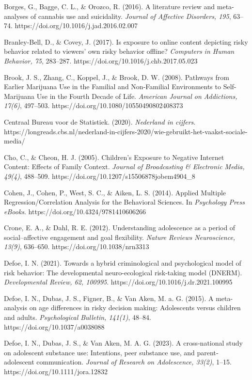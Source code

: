 \documentclass[
  letterpaper,
  DIV=11,
  numbers=noendperiod]{scrartcl}
\begin{document}
Borges, G., Bagge, C. L., \& Orozco, R. (2016). A literature review and
meta-analyses of cannabis use and suicidality. \emph{Journal of
Affective Disorders, 195}, 63--74.
https://doi.org/10.1016/j.jad.2016.02.007

Branley-Bell, D., \& Covey, J. (2017). Is exposure to online content
depicting risky behavior related to viewers' own risky behavior offline?
\emph{Computers in Human Behavior, 75}, 283--287.
https://doi.org/10.1016/j.chb.2017.05.023

Brook, J. S., Zhang, C., Koppel, J., \& Brook, D. W. (2008). Pathways
from Earlier Marijuana Use in the Familial and Non-Familial Environments
to Self-Marijuana Use in the Fourth Decade of Life. \emph{American
Journal on Addictions, 17(6)}, 497--503.
https://doi.org/10.1080/10550490802408373

Centraal Bureau voor de Statistiek. (2020). \emph{Nederland in cijfers}.
https://longreads.cbs.nl/nederland-in-cijfers-2020/wie-gebruikt-het-vaakst-sociale-
media/

Cho, C., \& Cheon, H. J. (2005). Children's Exposure to Negative
Internet Content: Effects of Family Context. \emph{Journal of
Broadcasting \& Electronic Media, 49(4)}, 488--509.
https://doi.org/10.1207/s15506878jobem4904\_8

Cohen, J., Cohen, P., West, S. C., \& Aiken, L. S. (2014). Applied
Multiple Regression/Correlation Analysis for the Behavioral Sciences. In
\emph{Psychology Press eBooks}. https://doi.org/10.4324/9781410606266

Crone, E. A., \& Dahl, R. E. (2012). Understanding adolescence as a
period of social--affective engagement and goal flexibility.
\emph{Nature Reviews Neuroscience, 13(9)}, 636--650.
https://doi.org/10.1038/nrn3313

Defoe, I. N. (2021). Towards a hybrid criminological and psychological
model of risk behavior: The developmental neuro-ecological risk-taking
model (DNERM). \emph{Developmental Review, 62, 100995}.
https://doi.org/10.1016/j.dr.2021.100995

Defoe, I. N., Dubas, J. S., Figner, B., \& Van Aken, M. a. G. (2015). A
meta-analysis on age differences in risky decision making: Adolescents
versus children and adults. \emph{Psychological Bulletin, 141(1)},
48--84. https://doi.org/10.1037/a0038088

Defoe, I. N., Dubas, J. S., \& Van Aken, M. A. G. (2023). A
cross‐national study on adolescent substance use: Intentions, peer
substance use, and parent‐adolescent communication. \emph{Journal of
Research on Adolescence, 33(2)}, 1--15.
https://doi.org/10.1111/jora.12832
\end{document}
